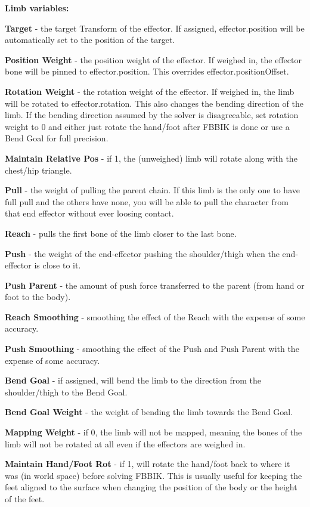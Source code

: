 {\bfseries Limb variables\+:}
\begin{DoxyItemize}
\item {\bfseries Target} -\/ the target Transform of the effector. If assigned, effector.\+position will be automatically set to the position of the target.
\item {\bfseries Position Weight} -\/ the position weight of the effector. If weighed in, the effector bone will be pinned to effector.\+position. This overrides effector.\+position\+Offset.
\item {\bfseries Rotation Weight} -\/ the rotation weight of the effector. If weighed in, the limb will be rotated to effector.\+rotation. This also changes the bending direction of the limb. If the bending direction assumed by the solver is disagreeable, set rotation weight to 0 and either just rotate the hand/foot after F\+B\+B\+IK is done or use a Bend Goal for full precision.
\item {\bfseries Maintain Relative Pos} -\/ if 1, the (unweighed) limb will rotate along with the chest/hip triangle.
\item {\bfseries Pull} -\/ the weight of pulling the parent chain. If this limb is the only one to have full pull and the others have none, you will be able to pull the character from that end effector without ever loosing contact.
\item {\bfseries Reach} -\/ pulls the first bone of the limb closer to the last bone.
\item {\bfseries Push} -\/ the weight of the end-\/effector pushing the shoulder/thigh when the end-\/effector is close to it.
\item {\bfseries Push Parent} -\/ the amount of push force transferred to the parent (from hand or foot to the body).
\item {\bfseries Reach Smoothing} -\/ smoothing the effect of the Reach with the expense of some accuracy.
\item {\bfseries Push Smoothing} -\/ smoothing the effect of the Push and Push Parent with the expense of some accuracy.
\item {\bfseries Bend Goal} -\/ if assigned, will bend the limb to the direction from the shoulder/thigh to the Bend Goal.
\item {\bfseries Bend Goal Weight} -\/ the weight of bending the limb towards the Bend Goal.
\item {\bfseries Mapping Weight} -\/ if 0, the limb will not be mapped, meaning the bones of the limb will not be rotated at all even if the effectors are weighed in.
\item {\bfseries Maintain Hand/\+Foot Rot} -\/ if 1, will rotate the hand/foot back to where it was (in world space) before solving F\+B\+B\+IK. This is usually useful for keeping the feet aligned to the surface when changing the position of the body or the height of the feet.
\end{DoxyItemize}

 